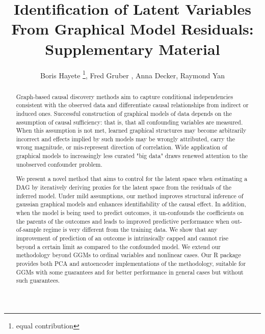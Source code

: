 \documentclass[letterpaper]{article}
\title{Identification of Latent Variables From Graphical Model Residuals: Supplementary Material}
\author{Boris Hayete \thanks{equal contribution}, Fred Gruber \footnotemark[1], Anna Decker, Raymond Yan}
\begin{document}
\maketitle

\begin{abstract}
Graph-based causal discovery methods aim to capture conditional independencies consistent with the observed data and differentiate causal relationships from indirect or induced ones.  Successful construction of graphical models of data depends on the assumption of causal sufficiency: that is, that all confounding variables are measured. When this assumption is not met, learned graphical structures may become arbitrarily incorrect and effects implied by such models may be wrongly attributed, carry the wrong magnitude, or mis-represent direction of correlation.  Wide application of graphical models to increasingly less curated "big data" draws renewed attention to the unobserved confounder problem.  

We present a novel method that aims to control for the latent space when estimating a DAG by iteratively deriving proxies for the latent space from the residuals of the inferred model.  Under mild assumptions, our method improves structural inference of gaussian graphical models and enhances identifiability of the causal effect. In addition, when the model is being used to predict outcomes, it un-confounds the coefficients on the parents of the outcomes and leads to improved predictive performance when out-of-sample regime is very different from the training data.  We show that any improvement of prediction of an outcome is intrinsically capped and cannot rise beyond a certain limit as compared to the confounded model.  We extend our methodology beyond GGMs to ordinal variables and nonlinear cases.  Our R package provides both PCA and autoencoder implementations of the methodology, suitable for GGMs with some guarantees and for better performance in general cases but without such guarantees. 
\end{abstract}
\end{document}
